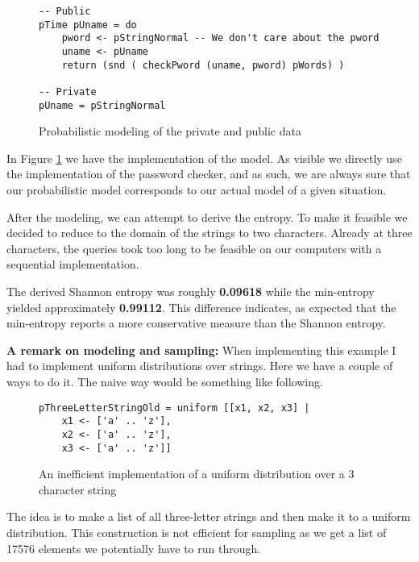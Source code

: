 \begin{figure}[H]
\begin{center}
\begin{verbatim}
-- Public
pTime pUname = do 
    pword <- pStringNormal -- We don't care about the pword
    uname <- pUname
    return (snd ( checkPword (uname, pword) pWords) )

-- Private
pUname = pStringNormal
\end{verbatim}
\end{center}
\caption{Probabilistic modeling of the private and public data}
\label{code:pword-model}
\end{figure}

In Figure \ref{code:pword-model} we have the implementation of the model.
As visible we directly use the implementation of the password checker, and
as such, we are always sure that our probabilistic model corresponds to
our actual model of a given situation.

After the modeling, we can attempt to derive the entropy. To make it feasible
we decided to reduce to the domain of the strings to two characters. Already at three
characters, the queries took too long to be feasible on our computers with a
sequential implementation.


The derived Shannon entropy was roughly \textbf{0.09618} while the min-entropy
yielded approximately \textbf{0.99112}. This difference indicates, as expected that
the min-entropy reports a more conservative measure than the Shannon entropy.

\textbf{A remark on modeling and sampling:} When implementing this example I
had to implement uniform distributions over strings. Here we have a couple of
ways to do it. The naive way would be something like following.

\begin{figure}[H]
\begin{center}
\begin{verbatim}
pThreeLetterStringOld = uniform [[x1, x2, x3] | 
    x1 <- ['a' .. 'z'],
    x2 <- ['a' .. 'z'],
    x3 <- ['a' .. 'z']]
\end{verbatim}
\end{center}
\caption{An inefficient implementation of a uniform distribution over a 3 character string}
\label{code:uniform-string-slow}
\end{figure}

The idea is to make a list of all three-letter strings and then make it to a
uniform distribution.
This construction is not efficient for sampling as we get a list of 17576
elements we potentially have to run through.

